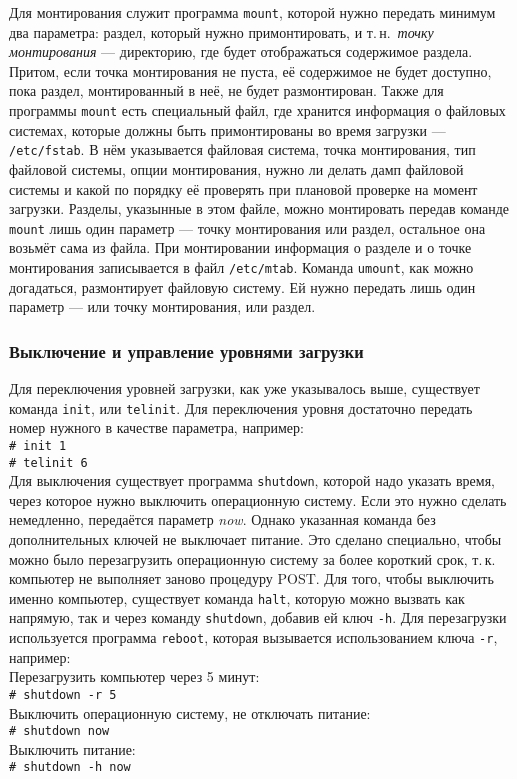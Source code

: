  Для монтирования служит программа \texttt{mount}, которой нужно передать минимум два параметра: раздел, который нужно примонтировать, и т.\,н.~\emph{точку монтирования} --- директорию, где будет отображаться содержимое раздела. Притом, если точка монтирования не пуста, её содержимое не будет доступно, пока раздел, монтированный в неё, не будет размонтирован.
 Также для программы \texttt{mount} есть специальный файл, где хранится информация о файловых системах, которые должны быть примонтированы во время загрузки --- \texttt{/etc/fstab}\label{fstab}. В нём указывается файловая система, точка монтирования, тип файловой системы, опции монтирования, нужно ли делать дамп файловой системы и какой по порядку её проверять при плановой проверке на момент загрузки.
 Разделы, указынные в этом файле, можно монтировать передав команде \texttt{mount} лишь один параметр --- точку монтирования или раздел, остальное она возьмёт сама из файла.
 При монтировании информация о разделе и о точке монтирования записывается в файл \texttt{/etc/mtab}.
 Команда \texttt{umount}, как можно догадаться, размонтирует файловую систему. Ей нужно передать лишь один параметр --- или точку монтирования, или раздел.

\subsubsection{Выключение и управление уровнями загрузки}\label{base:os:structure:sysutils:shutdown}
 Для переключения уровней загрузки, как уже указывалось выше, существует команда \texttt{init}, или \texttt{telinit}. Для переключения уровня достаточно передать номер нужного в качестве параметра, например:\\
  \texttt{\# init 1}\\
  \texttt{\# telinit 6}\\
 Для выключения существует программа \texttt{shutdown}, которой надо указать время, через которое нужно выключить операционную систему. Если это нужно сделать немедленно, передаётся параметр \emph{now}. Однако указанная команда без дополнительных ключей не выключает питание. Это сделано специально, чтобы можно было перезагрузить операционную систему за более короткий срок, т.\,к. компьютер не выполняет заново процедуру POST.
 Для того, чтобы выключить именно компьютер, существует команда \texttt{halt}, которую можно вызвать как напрямую, так и через команду \texttt{shutdown}, добавив ей ключ \texttt{-h}. Для перезагрузки используется программа \texttt{reboot}, которая вызывается использованием ключа \texttt{-r}, например:\\
 Перезагрузить компьютер через 5 минут:\\
  \texttt{\# shutdown -r 5}\\
 Выключить операционную систему, не отключать питание:\\
  \texttt{\# shutdown now}\\
 Выключить питание:\\
  \texttt{\# shutdown -h now}
 
